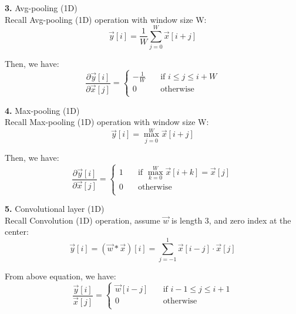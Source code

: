 \begin{description}
\item{\bf \large 3. } Avg-pooling (1D) \\
Recall Avg-pooling (1D) operation with window size W: 
\begin{equation}
	\vec{y}[i] = \frac{1}{W} \sum_{j=0}^W \vec{x}[i + j]
\end{equation}

Then, we have:
\begin{equation}
	\frac{\partial \vec{y}[i]}{\partial \vec{x}[j]} = 
		\begin{cases}
			- \frac{1}{W}	& \quad \text{if } i \leq j \leq i + W \\
			0				& \quad \text{otherwise} \\
		\end{cases}
\end{equation}

\item{\bf \large 4. } Max-pooling (1D) \\
Recall Max-pooling (1D) operation with window size W: 
\begin{equation}
	\vec{y}[i] = \max_{j=0}^W \vec{x}[i + j]
\end{equation}

Then, we have:
\begin{equation}
	\frac{\partial \vec{y}[i]}{\partial \vec{x}[j]} = 
		\begin{cases}
			1	& 	\quad \text{if } \max_{k=0}^W \vec{x}[i + k] = \vec{x}[j] \\
			0	& 	\quad \text{otherwise} \\
		\end{cases}
\end{equation}


\item{\bf \large 5. } Convolutional layer (1D)\\
Recall Convolution (1D) operation, assume $\vec{w}$ is length 3, and zero index at the center:
\begin{equation}
	\vec{y}[i] = (\vec{w} \ast \vec{x})[i] = \sum_{j=-1}^1 \vec{x}[i-j] \cdot \vec{x}[j]
\end{equation} 

From above equation, we have:
\begin{equation}
	\frac{\vec{y}[i]}{\vec{x}[j]} =
	\begin{cases}
			\vec{w}[i-j]	& 	\quad \text{if } i-1 \leq j \leq i+1 \\
			0	& 	\quad \text{otherwise} \\
		\end{cases}
\end{equation}


\end{description}
